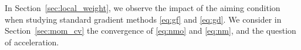 \documentclass{article}
\newcommand{\jh}[1]{{\color{red} #1}}
\def\R{{\mathbb{R}}}
\def\pl{{\text{PL}^\mu}}
\newcommand{\norm}[1]{\left\lVert#1\right\rVert}
\newcommand{\dotprod}[1]{\left< #1\right>}
\newcommand{\sqc}{\text{SQC}_{\tau}^{\mu}}
\newcommand{\ac}{\text{AC}^{a}}
\newcommand{\acf}[1]{\text{AC}^{#1}}
\theoremstyle{plain}
\theoremstyle{definition}
\newtheorem{definition}[theorem]{Definition}
\theoremstyle{remark}
\begin{document}
In Section~\ref{sec:local_weight}, we observe the impact of the aiming condition when studying standard gradient methods \eqref{eq:gf} and \eqref{eq:gd}. We consider in Section~\ref{sec:mom_cv} the convergence of 
\eqref{eq:nmo} and \eqref{eq:nm}, and the question of acceleration.




\end{document}
